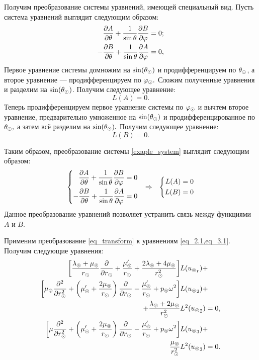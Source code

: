 Получим преобразование системы уравнений, имеющей специальный вид. Пусть система уравнений выглядит следующим образом:
\begin{equation}\label{exaple_system}
\begin{aligned}
\frac{\partial A}{\partial \theta} + \frac{1}{\sin\theta}\frac{\partial B}{\partial\varphi} &= 0;\\
- \frac{\partial B}{\partial\theta} + \frac{1}{\sin\theta}\frac{\partial A}{\partial \varphi}  &= 0,
\end{aligned}
\end{equation}
Первое уравнение системы домножим на $\sin(\theta_\odot)$ и продифференцируем по $\theta_\odot$, а второе уравнение --- продифференцируем по $\varphi_\odot.$ Сложим полученные уравнения и разделим на $\sin(\theta_\odot)$. Получим следующее уравнение:
\begin{equation*}
L(A) = 0.
\end{equation*}
Теперь продифференцируем первое уравнение системы по $\varphi_\odot$ и вычтем второе уравнение, предварительно умноженное на $\sin(\theta_\odot)$ и продифференцированное по $\theta_\odot,$ а затем всё разделим на $\sin(\theta_\odot).$ Получим следующее уравнение:
\begin{equation*}
L(B) = 0.
\end{equation*}

Таким образом, преобразование системы \cref{exaple_system} выглядит следующим образом:
\begin{align}\label{eq_transform}
\left\{\begin{aligned}
\dfrac{\partial A}{\partial \theta} + \dfrac{1}{\sin\theta}\dfrac{\partial B}{\partial\varphi} &= 0\\
- \dfrac{\partial B}{\partial\theta} + \dfrac{1}{\sin\theta}\dfrac{\partial A}{\partial \varphi} &= 0
\end{aligned}\right.
&& \Rightarrow &&
\left\{\begin{aligned}
L(A) &= 0\\
L(B) &= 0
\end{aligned}\right.
\end{align}
Данное преобразование уравнений позволяет устранить связь между функциями $A$ и $B.$

Применим преобразование \cref{eq_transform} к уравнениям \cref{eq_2.1,eq_3.1}. Получим следующие уравнения:
\begin{align}
\begin{split}
\left[\frac{\lambda_\circledcirc+\mu_\circledcirc}{r_\odot}\frac{\partial}{\partial r_\odot} + \frac{\mu'_\circledcirc}{r_\odot} + \frac{2\lambda_\circledcirc+4\mu_\circledcirc}{r_\odot^2}\right]&L({u_\circledcirc}_r)+\\
\left[\mu_\circledcirc\frac{\partial^2}{\partial r_\odot^2} + \left(\mu'_\circledcirc+\frac{2\mu_\circledcirc}{r_\odot}\right)\frac{\partial}{\partial r_\odot} - \frac{\mu'_\circledcirc}{r_\odot} + p_\circledcirc\omega^2\right]&L({u_\circledcirc}_2) + \\
 + \frac{\lambda_\circledcirc+2\mu_\circledcirc}{r_\odot^2}&L^2({u_\circledcirc}_2) = 0,
\end{split}\label{eq_2.2}\\
\begin{split}
\left[\mu\frac{\partial^2}{\partial r_\odot^2} + \left(\mu'_\circledcirc + \frac{2\mu_\circledcirc}{r_\odot}\right)\frac{\partial}{\partial r_\odot} - \frac{\mu'_\circledcirc}{r_\odot} + p_\circledcirc\omega^2\right]&L({u_\circledcirc}_3) + \\
\frac{\mu_\circledcirc}{r_\odot^2}&L^2({u_\circledcirc}_3) = 0.\label{eq_3.2}
\end{split}
\end{align}

